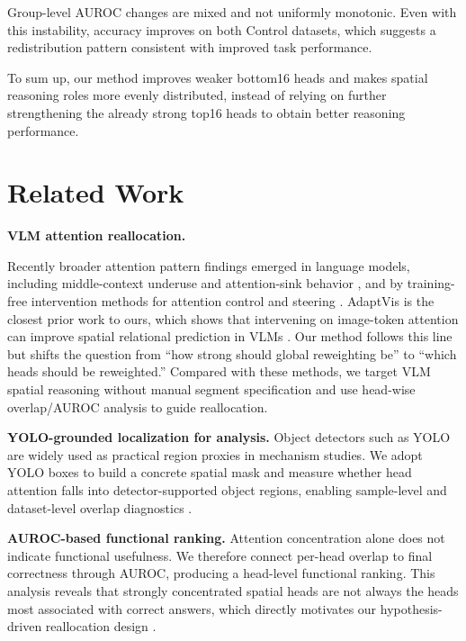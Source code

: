 \documentclass{article}
\begin{document}
Group-level AUROC changes are mixed and not uniformly monotonic. Even
with this instability, accuracy improves on both Control datasets, which
suggests a redistribution pattern consistent with improved task
performance.

To sum up, our method improves weaker bottom16 heads and makes spatial reasoning roles
more evenly distributed, instead of relying on further strengthening the
already strong top16 heads to obtain better reasoning performance.

\section{Related Work}

\textbf{VLM attention reallocation.}

Recently broader attention pattern findings emerged in language models,
including middle-context underuse and attention-sink behavior
\citep{liu2024lost,yu2024unveiling}, and by training-free
intervention methods for attention control and steering
\citep{li2026spectral,zheng2024laser}.
AdaptVis is the closest prior work to ours, which shows that
intervening on image-token attention can improve spatial relational
prediction in VLMs \citep{chen2024adaptvis}. Our method follows this line but
shifts the question from ``how strong should global reweighting be'' to
``which heads should be reweighted.'' 
Compared with these methods, we target VLM spatial reasoning without manual segment
specification and use head-wise overlap/AUROC analysis to guide
reallocation.

\textbf{YOLO-grounded localization for analysis.}
Object detectors such as YOLO are widely used as practical region
proxies in mechanism studies. We adopt YOLO boxes to build a concrete
spatial mask and measure whether head attention falls into
detector-supported object regions, enabling sample-level and
dataset-level overlap diagnostics \citep{redmon2016you}.

\textbf{AUROC-based functional ranking.}
Attention concentration alone does not indicate functional usefulness.
We therefore connect per-head overlap to final correctness through
AUROC, producing a head-level functional ranking. This analysis reveals
that strongly concentrated spatial heads are not always the heads most
associated with correct answers, which directly motivates our
hypothesis-driven reallocation design \citep{fawcett2006introduction}.
\end{document}
